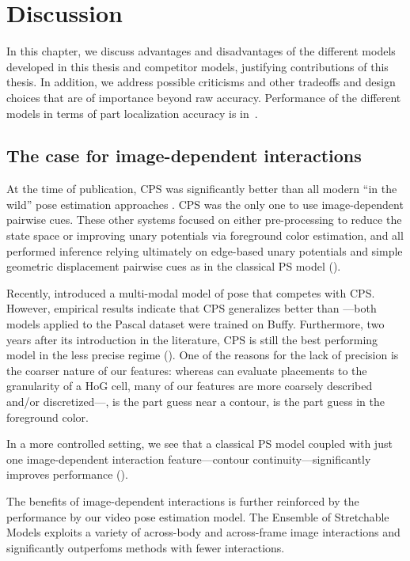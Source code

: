 \chapter{Discussion}\label{sec:discussion}

In this chapter, we discuss advantages and disadvantages of the different 
models developed in this thesis and competitor models, justifying contributions 
of this thesis.  In addition, we address possible criticisms and other 
tradeoffs and design choices that are of importance beyond raw accuracy.  
Performance of the different models in terms of part localization accuracy is 
in~.

\section{The case for image-dependent interactions}

At the time of publication, CPS was significantly better than all modern ``in 
the wild'' pose estimation approaches 
\citep{ferrari08,eichner09,devacrf,andriluka09}.  CPS was the only one to use 
image-dependent pairwise cues.  These other systems focused on either 
pre-processing to reduce the state space or improving unary potentials via 
foreground color estimation, and all performed inference relying ultimately on 
edge-based unary potentials and simple geometric displacement pairwise cues as 
in the classical PS model ().


Recently, \citet{deva2011} introduced a multi-modal model of pose that competes 
with CPS. However, empirical results indicate that CPS generalizes better than 
\citet{deva2011}---both models applied to the Pascal dataset were trained on 
Buffy.  Furthermore, two years after its introduction in the literature, CPS is 
still the best performing model in the less precise regime 
().  One of the reasons for the lack of precision 
is the coarser nature of our features: whereas \citet{deva2011} can evaluate 
placements to the granularity of a HoG cell, many of our features are more 
coarsely described and/or discretized---\eg, is the part guess near a contour, 
is the part guess in the foreground color.

In a more controlled setting, we see that a classical PS model coupled with 
just one image-dependent interaction feature---contour 
continuity---significantly improves performance ().

The benefits of image-dependent interactions is further reinforced by the 
performance by our video pose estimation model.  The Ensemble of Stretchable 
Models exploits a variety of across-body and across-frame image interactions 
and significantly outperfoms methods with fewer interactions.


